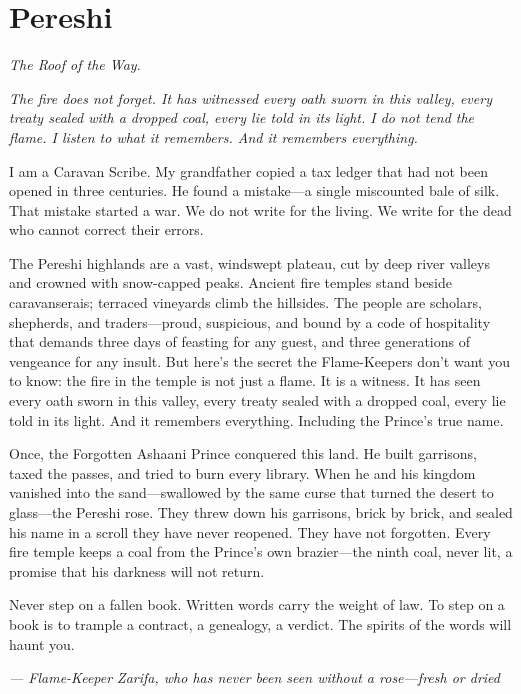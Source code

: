 \newpage

\newpage

\chapter{Pereshi}
\emph{The Roof of the Way.}

\noindent
{\Large
\textit{The fire does not forget. It has witnessed every oath sworn in this valley, every treaty sealed with a dropped coal, every lie told in its light. I do not tend the flame. I listen to what it remembers. And it remembers everything.}

\vspace{0.5em}

I am a Caravan Scribe. My grandfather copied a tax ledger that had not been opened in three centuries. He found a mistake---a single miscounted bale of silk. That mistake started a war. We do not write for the living. We write for the dead who cannot correct their errors.

\vspace{0.5em}

The Pereshi highlands are a vast, windswept plateau, cut by deep river valleys and crowned with snow-capped peaks. Ancient fire temples stand beside caravanserais; terraced vineyards climb the hillsides. The people are scholars, shepherds, and traders---proud, suspicious, and bound by a code of hospitality that demands three days of feasting for any guest, and three generations of vengeance for any insult. But here's the secret the Flame-Keepers don't want you to know: the fire in the temple is not just a flame. It is a witness. It has seen every oath sworn in this valley, every treaty sealed with a dropped coal, every lie told in its light. And it remembers everything. Including the Prince's true name.

\vspace{0.5em}

Once, the Forgotten Ashaani Prince conquered this land. He built garrisons, taxed the passes, and tried to burn every library. When he and his kingdom vanished into the sand---swallowed by the same curse that turned the desert to glass---the Pereshi rose. They threw down his garrisons, brick by brick, and sealed his name in a scroll they have never reopened. They have not forgotten. Every fire temple keeps a coal from the Prince's own brazier---the ninth coal, never lit, a promise that his darkness will not return.

\vspace{0.5em}

Never step on a fallen book. Written words carry the weight of law. To step on a book is to trample a contract, a genealogy, a verdict. The spirits of the words will haunt you.

\vspace{1em}

\noindent\textit{--- Flame-Keeper Zarifa, who has never been seen without a rose---fresh or dried}
}

